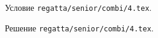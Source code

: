 Условие \texttt{regatta/senior/combi/4.tex}.

\solution Решение \texttt{regatta/senior/combi/4.tex}.
